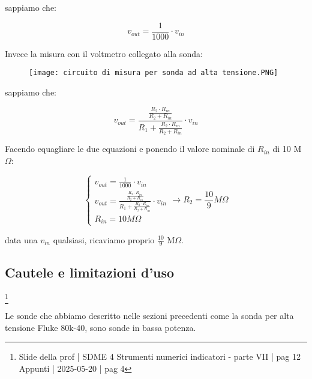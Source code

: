 sappiamo che: 

{
    \Large 
    \begin{equation}
        v_{out} = \frac{1}{1000} \cdot v_{in}
    \end{equation}
}

Invece la misura con il voltmetro collegato alla sonda: 

\begin{figure}[h]
    \centering
    \texttt{[image: circuito di misura per sonda ad alta tensione.PNG]}
\end{figure}

\newpage 

sappiamo che: 

{
    \Large 
    \begin{equation}
        v_{out}
        = 
        \frac{\frac{R_2 \cdot R_{in}}{R_2 + R_{in}}}{R_1 + \frac{R_2 \cdot R_{in}}{R_2 + R_{in}}} \cdot v_{in}
    \end{equation}
}

Facendo equagliare le due equazioni  e ponendo il valore nominale di $R_{in}$ di 10 M$\Omega$:

{
    \Large 
    \begin{equation}
        \begin{cases}
            v_{out} = \frac{1}{1000} \cdot v_{in}
            \\
            v_{out}
            = 
            \frac{\frac{R_2 \cdot R_{in}}{R_2 + R_{in}}}{R_1 + \frac{R_2 \cdot R_{in}}{R_2 + R_{in}}} \cdot v_{in}
            \\
            R_{in} = 10 M\Omega
        \end{cases}
        \rightarrow 
        R_2 = \frac{10}{9} M\Omega
    \end{equation}
}

data una $v_{in}$ qualsiasi, ricaviamo proprio $\frac{10}{9}$ M$\Omega$. \newline 

\newpage 

\subsection{Cautele e limitazioni d'uso}
\footnote{Slide della prof | SDME 4 Strumenti numerici indicatori - parte VII | pag 12\\  
Appunti | 2025-05-20 | pag 4 }

Le sonde che abbiamo descritto nelle sezioni precedenti come la sonda per alta tensione Fluke 80k-40, 
sono sonde in bassa potenza. \newline 

